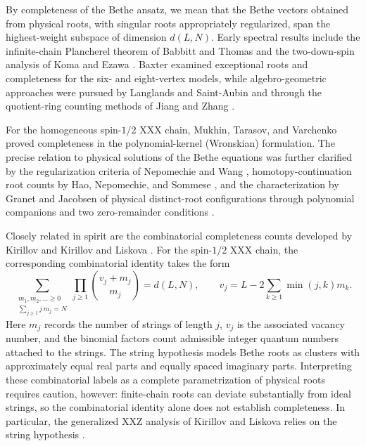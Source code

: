 \documentclass[11pt]{article}
\theoremstyle{definition}
\begin{document}
By completeness of the Bethe ansatz, we mean that the Bethe vectors
obtained from physical roots, with singular roots appropriately
regularized, span the highest-weight subspace of dimension $d(L,N)$. Early spectral results
include the infinite-chain Plancherel theorem of Babbitt and Thomas \cite{BT1977} and
the two-down-spin analysis of Koma and Ezawa \cite{KE1987}. Baxter
\cite{Baxter2002} examined exceptional roots and completeness for the
six- and eight-vertex models, while algebro-geometric approaches were pursued by
Langlands and Saint-Aubin \cite{LS1995} and through the quotient-ring counting
methods of Jiang and Zhang \cite{JZ2018}.

For the homogeneous spin-$1/2$ XXX chain, Mukhin, Tarasov, and
Varchenko \cite[Section~12]{MTV2009} proved completeness in the
polynomial-kernel (Wronskian) formulation. The precise relation to physical solutions of the Bethe equations was
further clarified by the regularization criteria of Nepomechie and Wang
\cite{NW2013,NW2014}, homotopy-continuation root counts by Hao, Nepomechie, and
Sommese \cite{HNS2013}, and the characterization by Granet and Jacobsen of
physical distinct-root configurations through polynomial companions
and two zero-remainder conditions \cite{GJ2020}.

Closely related in spirit are the combinatorial completeness counts developed by
Kirillov \cite{Kirillov1985} and Kirillov and Liskova \cite{KL1997}.
For the spin-$1/2$ XXX chain, the corresponding combinatorial identity takes the form
\[
\sum_{\substack{m_1,m_2,\ldots\ge 0\\
                         \sum_{j\ge 1}j\,m_j=N}}
              \prod_{j\ge 1}\binom{v_j+m_j}{m_j}=d(L,N),
 \qquad
 v_j=L-2\sum_{k\ge 1}\min(j,k)m_k.
\]
Here $m_j$ records the number of strings of length $j$, $v_j$ is
the associated vacancy number, and the binomial factors count admissible
integer quantum numbers attached to the strings. The string hypothesis models
Bethe roots as clusters with approximately equal real parts and equally
spaced imaginary parts. Interpreting these combinatorial labels as a
complete parametrization of physical roots requires caution, however:
finite-chain roots can deviate substantially from ideal strings, so the combinatorial
identity alone does not establish completeness. In particular, the generalized XXZ analysis of
Kirillov and Liskova relies on the string hypothesis \cite{KL1997}.
\end{document}
